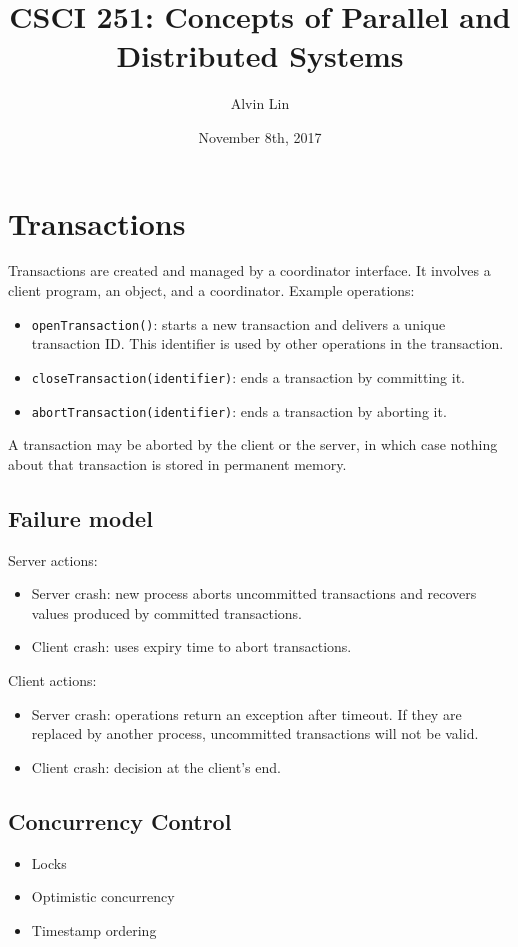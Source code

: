 \documentclass{math}
\title{CSCI 251: Concepts of Parallel and Distributed Systems}
\author{Alvin Lin}
\date{November 8th, 2017}
\begin{document}
\maketitle

\section*{Transactions}
Transactions are created and managed by a coordinator interface. It involves a
client program, an object, and a coordinator. Example operations:
\begin{itemize}
  \item \texttt{openTransaction()}: starts a new transaction and delivers a
  unique transaction ID. This identifier is used by other operations in the
  transaction.
  \item \texttt{closeTransaction(identifier)}: ends a transaction by
  committing it.
  \item \texttt{abortTransaction(identifier)}: ends a transaction by aborting
  it.
\end{itemize}
A transaction may be aborted by the client or the server, in which case nothing
about that transaction is stored in permanent memory.

\subsection*{Failure model}
Server actions:
\begin{itemize}
  \item Server crash: new process aborts uncommitted transactions and recovers
  values produced by committed transactions.
  \item Client crash: uses expiry time to abort transactions.
\end{itemize}
Client actions:
\begin{itemize}
  \item Server crash: operations return an exception after timeout. If they are
  replaced by another process, uncommitted transactions will not be valid.
  \item Client crash: decision at the client's end.
\end{itemize}

\subsection*{Concurrency Control}
\begin{itemize}
  \item Locks
  \item Optimistic concurrency
  \item Timestamp ordering
\end{itemize}
\end{document}
